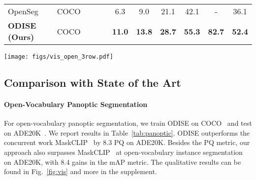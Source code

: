 \documentclass[10pt,twocolumn,letterpaper]{article}
\newcommand{\cmark}{\ding{51}}
\newcommand{\ourmethod}{ODISE}
\begin{document}
\begin{table*}[]
\begin{tabular}{l|l|ccc|cccccc}
OpenSeg\cite{ghiasi2021open}      & COCO       &          & \cmark   & \cmark    & 6.3           & 9.0           & 21.1          & 42.1          & -             & 36.1          \\
\textbf{\ourmethod{} (Ours)}         & COCO       &          & \cmark   & \cmark    & \textbf{11.0} & \textbf{13.8} & \textbf{28.7} & \textbf{55.3} & \textbf{82.7} & \textbf{52.4}
\end{tabular}
\vspace{-1em}
\caption{
    \label{tab:semantic}
    \textbf{Open-vocabulary semantic segmentation performance.}
}
\vspace{-1.2em}
\end{table*}

\begin{figure*}[t]
    \centering
    \vspace{-.5em}
    \texttt{[image: figs/vis\_open\_3row.pdf]}
    \vspace{-1em}
    \caption{
        \textbf{Qualitative Visualization} on COCO (first 2 rows) and ADE20K (last row) validation and test sets. 
        To demonstrate open-vocabulary recognition capability, we merge category names of LVIS, COCO and ADE20K together and perform open-vocabulary inference with  classes directly.
        ``Bamboo'', ``swimming pool'', ``conveyer belt", ``chandelier", ``booth'', ``stool'', ``column'', ``pool table'', ``bannister'', \textit{etc.}, are novel categories from LVIS/ADE20K that are not annotated in COCO. 
        \ourmethod{} shows plausible open-vocabulary panoptic results. The supplement contains more visual results.
    }
    \vspace{-1.2em}
    \label{fig:vis}
\end{figure*}

\subsection{Comparison with State of the Art}
\paragraph{Open-Vocabulary Panoptic Segmentation}
For open-vocabulary panoptic segmentation, we train \ourmethod{} on COCO~\cite{lin2014coco} and test on ADE20K~\cite{zhou2019ade}.
We report results in Table~\ref{tab:panoptic}.
\ourmethod{} outperforms the concurrent work MaskCLIP~\cite{ding2022open} by 8.3 PQ on ADE20K. 
Besides the PQ metric, our approach also surpasses MaskCLIP~\cite{ding2022open} at open-vocabulary instance segmentation on ADE20K, with 8.4 gains in the mAP metric.
The qualitative results can be found in Fig.~\ref{fig:vis} and more in the supplement.
\end{document}

